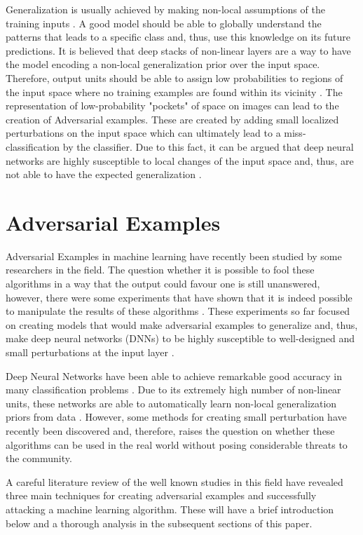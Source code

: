 \documentclass{article}
\begin{document}
Generalization is usually achieved by making non-local assumptions of the training inputs \cite{gu2014}. A good model should be able to globally understand the patterns that leads to a specific class and, thus, use this knowledge on its future predictions. It is believed that deep stacks of non-linear layers are a way to have the model encoding a non-local generalization prior over the input space. Therefore, output units should be able to assign low probabilities to regions of the input space where no training examples are found within its vicinity \cite{szegedy2013}. The representation of low-probability "pockets" of space on images can lead to the creation of Adversarial examples. These are created by adding small localized perturbations on the input space which can ultimately lead to a miss-classification by the classifier. Due to this fact, it can be argued that deep neural networks are highly susceptible to local changes of the input space and, thus, are not able to have the expected generalization \cite{goodfellow2014}.

\section{Adversarial Examples}\label{sec: adversarial}

Adversarial Examples in machine learning have recently been studied by some researchers in the field. The question whether it is possible to fool these algorithms in a way that the output could favour one is still unanswered, however, there were some experiments that have shown that it is indeed possible to manipulate the results of these algorithms \cite{nguyen2015}. These experiments so far focused on creating models that would make adversarial examples to generalize and, thus, make deep neural networks (DNNs) to be highly susceptible to well-designed and small perturbations at the input layer \cite{gu2014}.

Deep Neural Networks have been able to achieve remarkable good accuracy in many classification problems \cite{krizhevsky2012}. Due to its extremely high number of non-linear units, these networks are able to automatically learn non-local generalization priors from data \cite{szegedy2013}. However, some methods for creating small perturbation have recently been discovered and, therefore, raises the question on whether these algorithms can be used in the real world without posing considerable threats to the community.

A careful literature review of the well known studies in this field have revealed three main techniques for creating adversarial examples and successfully attacking a machine learning algorithm. These will have a brief introduction below and a thorough analysis in the subsequent sections of this paper.
\end{document}
